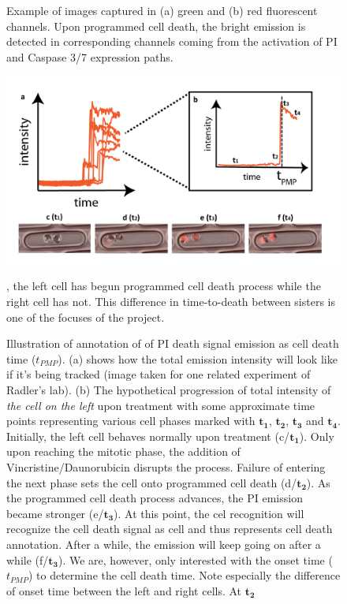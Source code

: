\documentclass[pdftex,12pt,a4paper]{report}
\begin{document}
\begin{figure}[H]
\caption{Example of images captured in (a) green and (b) red fluorescent channels. Upon programmed cell death, the bright emission is detected in corresponding channels coming from the activation of PI and Caspase 3/7 expression paths.}

\label{fig:onset_samples}
\end{figure}


\begin{figure}[H]
\centering
\includegraphics[width=\textwidth]{images/cell_death_detection}
\caption{Illustration of annotation of of PI death signal emission as cell death time ($t_{PMP}$). (a) shows how the total emission intensity will look like if it's being tracked (image taken for one related experiment of Radler's lab). (b) The hypothetical progression of total intensity of \textit{the cell on the left} upon treatment with some approximate time points representing various cell phases marked with $\mathbf{t_1}$, $\mathbf{t_2}$, $\mathbf{t_3}$ and $\mathbf{t_4}$. Initially, the left cell behaves normally upon treatment (c/$\mathbf{t_1}$). Only upon reaching the mitotic phase, the addition of Vincristine/Daunorubicin disrupts the process. Failure of entering the next phase sets the cell onto programmed cell death (d/$\mathbf{t_2}$). As the programmed cell death process advances, the PI emission became stronger (e/$\mathbf{t_3}$). At this point, the cel recognition will recognize the cell death signal as cell and thus represents cell death annotation. After a while, the emission will keep going on after a while (f/$\mathbf{t_3}$). We are, however, only interested with the onset time ($t_{PMP}$) to determine the cell death time. Note especially the difference of onset time between the left and right cells. At $\mathbf{t_2}$}, the left cell has begun programmed cell death process while the right cell has not. This difference in time-to-death between sisters is one of the focuses of the project.
\label{fig:cell_death_determination_example}
\end{figure}
\end{document}

